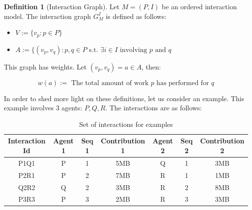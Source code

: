 \documentclass[a4paper,11pt]{book}
\theoremstyle{definition}
\newtheorem{definition}{Definition}
\begin{document}
\begin{definition}[Interaction Graph]
    Let $M = (P, I)$ be an ordered interaction model. The interaction graph $G^I_M$ is defined as follows:

    \begin{itemize}
        \item $V := \{ v_p : p \in P \}$\\
        \item $A := \{ (v_p, v_q) : p, q \in P \mbox{ s.t. } \exists i \in I \mbox{ involving } p \mbox{ and } q$ \\
    \end{itemize}

    This graph has weights. Let $(v_{p}, v_q) = a \in A$, then:

    \begin{equation*}
        w(a) := \mbox{ The total amount of work } p \mbox{ has performed for } q
    \end{equation*}
\end{definition}

In order to shed more light on these definitions, let us consider an example. This example involves
3 agents: $P, Q, R$. The interactions are as follows:

\begin{table}[h]
    \centering
    \begin{tabular}{c|c|c|c|c|c|c}
        Interaction Id & Agent 1 & Seq 1 & Contribution 1 & Agent 2 & Seq 2 & Contribution 2 \\\hline
        P1Q1           & P       & 1                 & 5MB            & Q       & 1                 & 3MB            \\
        P2R1           & P       & 2                 & 7MB            & R       & 1                 & 1MB            \\
        Q2R2           & Q       & 2                 & 3MB            & R       & 2                 & 8MB            \\
        P3R3           & P       & 3                 & 2MB            & R       & 3                 & 3MB            \\
    \end{tabular}
    \caption{Set of interactions for examples}
    \label{tab:interactions}
\end{table}
\end{document}
